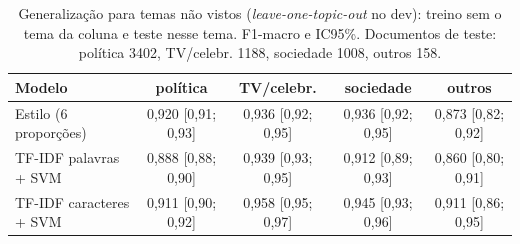 \begin{table}[t]\centering\scriptsize
\caption{Generalização para temas não vistos (\emph{leave-one-topic-out} no dev): treino sem o tema da coluna e teste nesse tema. F1-macro e IC95\%. Documentos de teste: política 3402, TV/celebr. 1188, sociedade 1008, outros 158.}\label{tab:loto}
\begin{tabular}{lcccc}
\toprule
Modelo & política & TV/celebr. & sociedade & outros \\
\midrule
Estilo (6 proporções) & 0,920 {\tiny[0,91; 0,93]} & 0,936 {\tiny[0,92; 0,95]} & 0,936 {\tiny[0,92; 0,95]} & 0,873 {\tiny[0,82; 0,92]} \\
TF-IDF palavras + SVM & 0,888 {\tiny[0,88; 0,90]} & 0,939 {\tiny[0,93; 0,95]} & 0,912 {\tiny[0,89; 0,93]} & 0,860 {\tiny[0,80; 0,91]} \\
TF-IDF caracteres + SVM & 0,911 {\tiny[0,90; 0,92]} & 0,958 {\tiny[0,95; 0,97]} & 0,945 {\tiny[0,93; 0,96]} & 0,911 {\tiny[0,86; 0,95]} \\
\bottomrule
\end{tabular}
\end{table}
